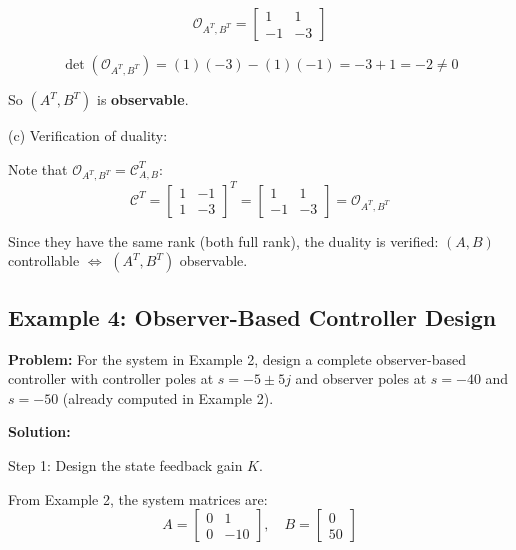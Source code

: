 \begin{equation}
\mathcal{O}_{A^T, B^T} = \begin{bmatrix} 1 & 1 \\ -1 & -3 \end{bmatrix}
\end{equation}

\begin{equation}
\det(\mathcal{O}_{A^T, B^T}) = (1)(-3) - (1)(-1) = -3 + 1 = -2 \neq 0
\end{equation}

So $(A^T, B^T)$ is \textbf{observable}.

(c) Verification of duality:

Note that $\mathcal{O}_{A^T, B^T} = \mathcal{C}_{A,B}^T$:
\begin{equation}
\mathcal{C}^T = \begin{bmatrix} 1 & -1 \\ 1 & -3 \end{bmatrix}^T = \begin{bmatrix} 1 & 1 \\ -1 & -3 \end{bmatrix} = \mathcal{O}_{A^T, B^T}
\end{equation}

Since they have the same rank (both full rank), the duality is verified: $(A, B)$ controllable $\Leftrightarrow$ $(A^T, B^T)$ observable.

\hrulefill

\subsection{Example 4: Observer-Based Controller Design}

\textbf{Problem:} For the system in Example 2, design a complete observer-based controller with controller poles at $s = -5 \pm 5j$ and observer poles at $s = -40$ and $s = -50$ (already computed in Example 2).

\textbf{Solution:}

Step 1: Design the state feedback gain $K$.

From Example 2, the system matrices are:
\begin{equation}
A = \begin{bmatrix} 0 & 1 \\ 0 & -10 \end{bmatrix}, \quad
B = \begin{bmatrix} 0 \\ 50 \end{bmatrix}
\end{equation}

